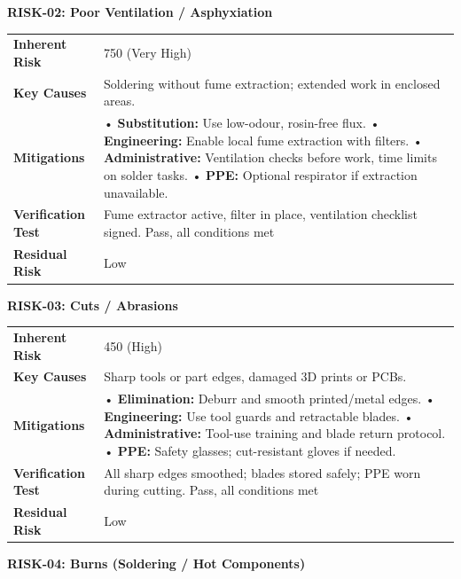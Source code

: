 \pagebreak
\textbf{RISK-02: Poor Ventilation / Asphyxiation}

\begin{tabular}{@{}p{3cm}p{13cm}@{}}
\toprule
\textbf{Inherent Risk} & 750 (Very High) \\
\textbf{Key Causes} & Soldering without fume extraction; extended work in enclosed areas. \\
\textbf{Mitigations} &
• \textbf{Substitution:} Use low-odour, rosin-free flux. \newline
• \textbf{Engineering:} Enable local fume extraction with filters. \newline
• \textbf{Administrative:} Ventilation checks before work, time limits on solder tasks. \newline
• \textbf{PPE:} Optional respirator if extraction unavailable. \\
\textbf{Verification Test} & Fume extractor active, filter in place, ventilation checklist signed. Pass, all conditions met \\
\textbf{Residual Risk} & Low \\
\bottomrule
\end{tabular}
\vspace{0.6em}

\textbf{RISK-03: Cuts / Abrasions}

\begin{tabular}{@{}p{3cm}p{13cm}@{}}
\toprule
\textbf{Inherent Risk} & 450 (High) \\
\textbf{Key Causes} & Sharp tools or part edges, damaged 3D prints or PCBs. \\
\textbf{Mitigations} &
• \textbf{Elimination:} Deburr and smooth printed/metal edges. \newline
• \textbf{Engineering:} Use tool guards and retractable blades. \newline
• \textbf{Administrative:} Tool-use training and blade return protocol. \newline
• \textbf{PPE:} Safety glasses; cut-resistant gloves if needed. \\
\textbf{Verification Test} & All sharp edges smoothed; blades stored safely; PPE worn during cutting. Pass, all conditions met \\
\textbf{Residual Risk} & Low \\
\bottomrule
\end{tabular}
\vspace{0.6em}

\textbf{RISK-04: Burns (Soldering / Hot Components)}

